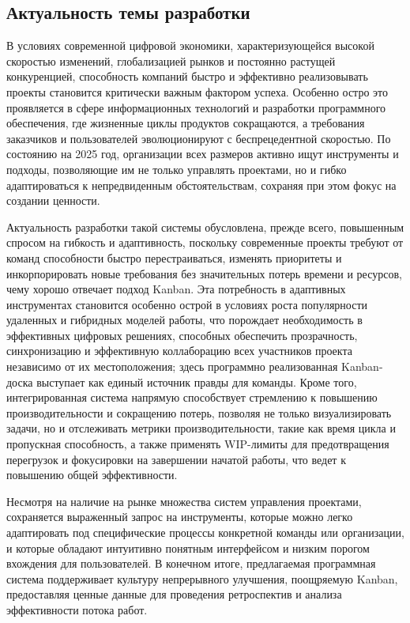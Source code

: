 \subsection{Актуальность темы разработки}
В условиях современной цифровой экономики, характеризующейся высокой скоростью изменений, глобализацией рынков и постоянно растущей конкуренцией, способность компаний быстро и эффективно реализовывать проекты становится критически важным фактором успеха. Особенно остро это проявляется в сфере информационных технологий и разработки программного обеспечения, где жизненные циклы продуктов сокращаются, а требования заказчиков и пользователей эволюционируют с беспрецедентной скоростью. По состоянию на 2025 год, организации всех размеров активно ищут инструменты и подходы, позволяющие им не только управлять проектами, но и гибко адаптироваться к непредвиденным обстоятельствам, сохраняя при этом фокус на создании ценности.

Актуальность разработки такой системы обусловлена, прежде всего, повышенным спросом на гибкость и адаптивность, поскольку современные проекты требуют от команд способности быстро перестраиваться, изменять приоритеты и инкорпорировать новые требования без значительных потерь времени и ресурсов, чему хорошо отвечает подход Kanban. Эта потребность в адаптивных инструментах становится особенно острой в условиях роста популярности удаленных и гибридных моделей работы, что порождает необходимость в эффективных цифровых решениях, способных обеспечить прозрачность, синхронизацию и эффективную коллаборацию всех участников проекта независимо от их местоположения; здесь программно реализованная Kanban-доска выступает как единый источник правды для команды. Кроме того, интегрированная система напрямую способствует стремлению к повышению производительности и сокращению потерь, позволяя не только визуализировать задачи, но и отслеживать метрики производительности, такие как время цикла и пропускная способность, а также применять WIP-лимиты для предотвращения перегрузок и фокусировки на завершении начатой работы, что ведет к повышению общей эффективности. 

Несмотря на наличие на рынке множества систем управления проектами, сохраняется выраженный запрос на инструменты, которые можно легко адаптировать под специфические процессы конкретной команды или организации, и которые обладают интуитивно понятным интерфейсом и низким порогом вхождения для пользователей. В конечном итоге, предлагаемая программная система поддерживает культуру непрерывного улучшения, поощряемую Kanban, предоставляя ценные данные для проведения ретроспектив и анализа эффективности потока работ.
